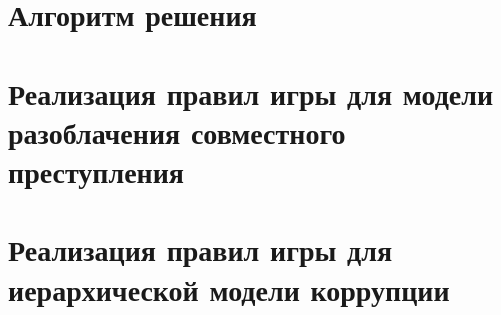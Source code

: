 \chapter{Алгоритм решения}

\chapter{Реализация правил игры для модели разоблачения совместного преступления}

\chapter{Реализация правил игры для иерархической модели коррупции}

